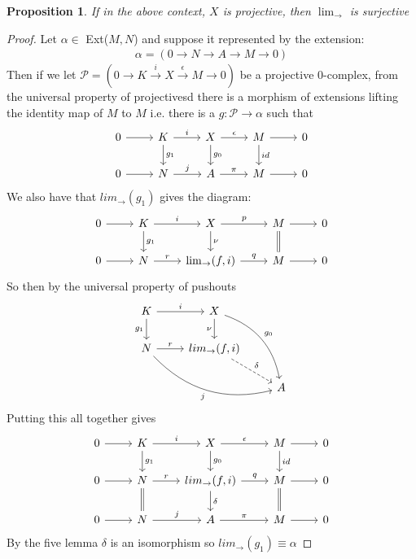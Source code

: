 \documentclass[12pt]{book}
\newtheorem{proposition}[theorem]{Proposition}
\theoremstyle{definition}
\begin{document}
\begin{proposition}
    If in the above context, $X$ is projective, then $\lim_\rightarrow$ is surjective
\end{proposition}
\begin{proof}
    Let $\alpha \in$ Ext($M,N$) and suppose it represented by the extension: 
    \begin{align*}
        \alpha = (0 \rightarrow N \rightarrow A \rightarrow M \rightarrow 0)
    \end{align*} 
    Then if we let $\mathcal{P} = (0 \rightarrow K \xrightarrow{i} X \xrightarrow{\epsilon} M \rightarrow 0)$ be a projective 0-complex, from the universal property of projectivesd there is a morphism of extensions lifting the identity map of $M$ to $M$ i.e. there is a $g: \mathcal{P} \to \alpha$ such that 
    \[
    \begin{tikzcd}
        0 \arrow[r] & K \arrow[r, "i"] \arrow[d, "g_1"] 
        & X \arrow[r, "\epsilon"] \arrow[d, "g_0"] 
        & M \arrow[r] \arrow[d, "id"]
        & 0\\
        0 \arrow[r] & N \arrow[r, "j"] 
        & A \arrow[r, "\pi"]  
        & M \arrow[r] 
        & 0
    \end{tikzcd}
    \]
    We also have that $lim_\rightarrow(g_1)$ gives the diagram: 
    \[
    \begin{tikzcd}
        0 \arrow[r] & K \arrow[r, "i"] \arrow[d, "g_1"] 
        & X \arrow[r, "p"] \arrow[d, "\nu"] 
        & M \arrow[r] \arrow[d, equal]
        & 0\\
        0 \arrow[r] & N \arrow[r, "r"] 
        & \lim_{\rightarrow}(f,i) \arrow[r, "q"]  
        & M \arrow[r] 
        & 0
    \end{tikzcd}
    \]
    So then by the universal property of pushouts
    \[
    \begin{tikzcd}
    K \arrow[d,"g_1"'] \arrow[r,"i"] &
    X \arrow[d,"\nu"'] \arrow[ddr,bend left,"g_0"] \\
    N \arrow[r,"r"] \arrow[drr,bend right,"j"'] &
    lim_\rightarrow(f,i) \arrow[dr,dashed,"\delta"] \\
    && A
    \end{tikzcd}
    \]
    Putting this all together gives 
    \[
    \begin{tikzcd}
        0 \arrow[r] & K \arrow[r, "i"] \arrow[d, "g_1"] 
        & X \arrow[r, "\epsilon"] \arrow[d, "g_0"] 
        & M \arrow[r] \arrow[d, "id"]
        & 0\\
        0 \arrow[r] & N \arrow[r, "r"] \arrow[d, equal]
        & lim_\rightarrow(f,i) \arrow[r, "q"] \arrow[d, "\delta"] 
        & M \arrow[r] \arrow[d, equal]
        & 0\\
        0 \arrow[r] & N \arrow[r, "j"]
        & A \arrow[r, "\pi"]
        & M \arrow[r]
        & 0
    \end{tikzcd}
    \]
    By the five lemma $\delta$ is an isomorphism so $lim_\rightarrow(g_1) \equiv \alpha$
\end{proof}
\end{document}

